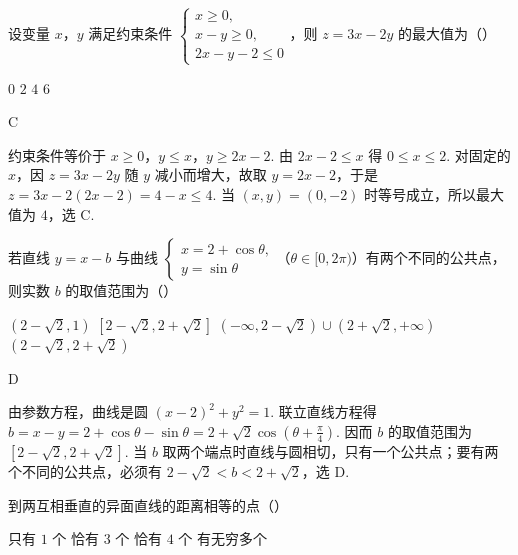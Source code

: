 \begin{problem}
设变量 \(x\)，\(y\) 满足约束条件 \(\begin{cases}
x \geqslant 0,\\
x - y \geqslant 0,\\
2x - y - 2 \leqslant 0
\end{cases}\)，则 \(z = 3x - 2y\) 的最大值为（\quad）

\choices
    {\(0\)}
    {\(2\)}
    {\(4\)}
    {\(6\)}
\end{problem}

\begin{answer}
C
\end{answer}

\begin{solution}
约束条件等价于 \(x\geq0\)，\(y\leq x\)，\(y\geq2x-2\). 由 \(2x-2\leq x\) 得 \(0\leq x\leq2\). 对固定的 \(x\)，因 \(z=3x-2y\) 随 \(y\) 减小而增大，故取 \(y=2x-2\)，于是 \(z=3x-2(2x-2)=4-x\leq4\). 当 \((x,y)=(0,-2)\) 时等号成立，所以最大值为 \(4\)，选 C.
\end{solution}

\begin{problem}
若直线 \(y = x - b\) 与曲线 \(\begin{cases}
x = 2 + \cos \theta,\\
y = \sin \theta
\end{cases}\)（\(\theta \in [0, 2\pi)\)）有两个不同的公共点，则实数 \(b\) 的取值范围为（\quad）

\choices
    {\((2 - \sqrt{2}, 1)\)}
    {\([2 - \sqrt{2}, 2 + \sqrt{2}]\)}
    {\((-\infty, 2 - \sqrt{2}) \cup (2 + \sqrt{2}, +\infty)\)}
    {\((2 - \sqrt{2}, 2 + \sqrt{2})\)}
\end{problem}

\begin{answer}
D
\end{answer}

\begin{solution}
由参数方程，曲线是圆 \((x-2)^2+y^2=1\). 联立直线方程得 \(b=x-y=2+\cos\theta-\sin\theta=2+\sqrt{2}\cos\left(\theta+\frac{\pi}{4}\right)\). 因而 \(b\) 的取值范围为 \([2-\sqrt{2},2+\sqrt{2}]\). 当 \(b\) 取两个端点时直线与圆相切，只有一个公共点；要有两个不同的公共点，必须有 \(2-\sqrt{2}<b<2+\sqrt{2}\)，选 D.
\end{solution}

\begin{problem}
到两互相垂直的异面直线的距离相等的点（\quad）

\choices
    {只有 \(1\) 个}
    {恰有 \(3\) 个}
    {恰有 \(4\) 个}
    {有无穷多个}
\end{problem}

